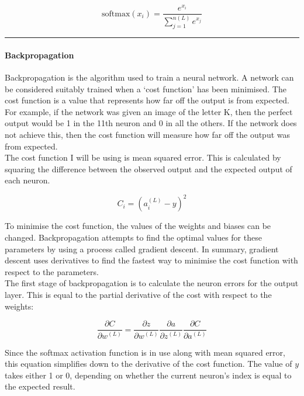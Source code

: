\documentclass{article}
\begin{document}
\begin{equation*}
    \text{softmax}(x_i)=\frac{e^{x_i}}{\sum_{j=1}^{n(L)}e^{x_j}}
\end{equation*}

\begin{center}
\rule{0.5\linewidth}{0.4pt}
\end{center}
\paragraph{Backpropagation\\}
Backpropagation is the algorithm used to train a neural network. A network can be considered suitably trained when a `cost function' has been minimised. The cost function is a value that represents how far off the output is from expected. For example, if the network was given an image of the letter K, then the perfect output would be 1 in the 11th neuron and 0 in all the others. If the network does not achieve this, then the cost function will measure how far off the output was from expected. \\

The cost function I will be using is mean squared error. This is calculated by squaring the difference between the observed output and the expected output of each neuron.

\begin{equation*}
    C_i=\left(a_i^{(L)}-y\right)^{2}
\end{equation*}

To minimise the cost function, the values of the weights and biases can be changed. Backpropagation attempts to find the optimal values for these parameters by using a process called gradient descent. In summary, gradient descent uses derivatives to find the fastest way to minimise the cost function with respect to the parameters. \\

The first stage of backpropagation is to calculate the neuron errors for the output layer. This is equal to the partial derivative of the cost with respect to the weights:

\begin{equation*}
    \frac{\partial C}{\partial w^{(L)}}=\frac{\partial z}{\partial w^{(L)}}\frac{\partial a}{\partial z^{(L)}}\frac{\partial C}{\partial a^{(L)}}
\end{equation*}

Since the softmax activation function is in use along with mean squared error, this equation simplifies down to the derivative of the cost function. The value of \(y\) takes either 1 or 0, depending on whether the current neuron's index is equal to the expected result.
\end{document}

